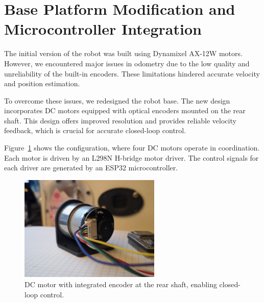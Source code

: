 \section{Base Platform Modification and Microcontroller Integration}
The initial version of the robot was built using Dynamixel AX-12W motors. However, we encountered major issues in odometry due to the low quality and unreliability of the built-in encoders. These limitations hindered accurate velocity and position estimation.

To overcome these issues, we redesigned the robot base. The new design incorporates DC motors equipped with optical encoders mounted on the rear shaft. This design offers improved resolution and provides reliable velocity feedback, which is crucial for accurate closed-loop control.

Figure~\ref{fig:encoder-mounting} shows the configuration, where four DC motors operate in coordination. Each motor is driven by an L298N H-bridge motor driver. The control signals for each driver are generated by an ESP32 microcontroller.
        
\begin{figure}[H]
    \centering
    \includegraphics[width=0.6\textwidth]{assets/images/hardware/dc-motor2.jpeg}
    \caption{DC motor with integrated encoder at the rear shaft, enabling closed-loop control.}
    \label{fig:encoder-mounting}
\end{figure}
        
